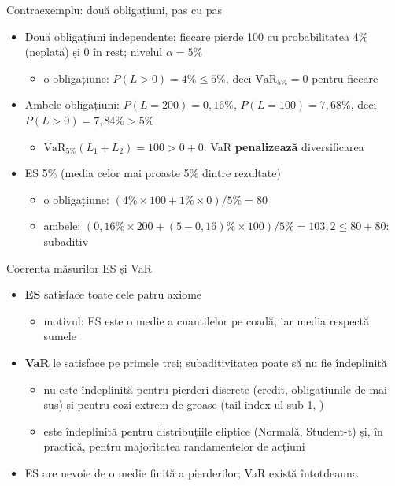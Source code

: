 \begin{frame}{Contraexemplu: două obligațiuni, pas cu pas}
\itemsize{\footnotesize}
\begin{itemize}
    \item Două obligațiuni independente; fiecare pierde 100 cu probabilitatea 4\% (neplată) și 0 în rest; nivelul $\alpha = 5\%$
    \begin{itemize}
        \item o obligațiune: $P(L > 0) = 4\% \le 5\%$, deci $\mathrm{VaR}_{5\%} = 0$ pentru fiecare
    \end{itemize}
    \item Ambele obligațiuni: $P(L = 200) = 0{,}16\%$, $P(L = 100) = 7{,}68\%$, deci $P(L > 0) = 7{,}84\% > 5\%$
    \begin{itemize}
        \item $\mathrm{VaR}_{5\%}(L_1 + L_2) = 100 > 0 + 0$: VaR \textbf{penalizează} diversificarea
    \end{itemize}
    \item ES 5\% (media celor mai proaste 5\% dintre rezultate)
    \begin{itemize}
        \item o obligațiune: $(4\% \times 100 + 1\% \times 0)/5\% = 80$
        \item ambele: $(0{,}16\% \times 200 + (5 - 0{,}16)\% \times 100)/5\% = 103{,}2 \le 80 + 80$: subaditiv
    \end{itemize}
\end{itemize}
\end{frame}

\begin{frame}{Coerența măsurilor ES și VaR}
\itemsize{\small}
\begin{itemize}
    \item \textbf{ES} satisface toate cele patru axiome 
    \begin{itemize}
        \item motivul: ES este o medie a cuantilelor pe coadă, iar media respectă sumele
    \end{itemize}
    \item \textbf{VaR} le satisface pe primele trei; subaditivitatea poate să nu fie îndeplinită
    \begin{itemize}
        \item nu este îndeplinită pentru pierderi discrete (credit, obligațiunile de mai sus) și pentru cozi extrem de groase (tail index-ul sub 1, )
        \item este îndeplinită pentru distribuțiile eliptice (Normală, Student-t) și, în practică, pentru majoritatea randamentelor de acțiuni 
    \end{itemize}
    \item ES are nevoie de o medie finită a pierderilor; VaR există întotdeauna
\end{itemize}
\end{frame}

